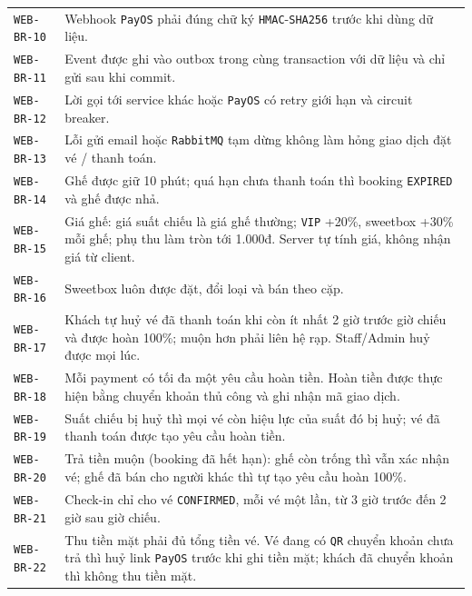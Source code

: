 \begin{longtable}{@{}P{0.23000\SRSWidth}P{0.77000\SRSWidth}@{}}
\texttt{WEB-\allowbreak{}BR-\allowbreak{}10} & Webhook \texttt{Pay\allowbreak{}OS} phải đúng chữ ký \texttt{HMAC}-\texttt{SHA256} trước khi dùng dữ liệu. \\[3pt]
\texttt{WEB-\allowbreak{}BR-\allowbreak{}11} & Event được ghi vào outbox trong cùng transaction với dữ liệu và chỉ gửi sau khi commit. \\[3pt]
\texttt{WEB-\allowbreak{}BR-\allowbreak{}12} & Lời gọi tới service khác hoặc \texttt{Pay\allowbreak{}OS} có retry giới hạn và circuit breaker. \\[3pt]
\texttt{WEB-\allowbreak{}BR-\allowbreak{}13} & Lỗi gửi email hoặc \texttt{Rabbit\allowbreak{}MQ} tạm dừng không làm hỏng giao dịch đặt vé /\allowbreak{} thanh toán. \\[3pt]
\texttt{WEB-\allowbreak{}BR-\allowbreak{}14} & Ghế được giữ 10 phút; quá hạn chưa thanh toán thì booking \texttt{EXPIRED} và ghế được nhả. \\[3pt]
\texttt{WEB-\allowbreak{}BR-\allowbreak{}15} & Giá ghế: giá suất chiếu là giá ghế thường; \texttt{VIP} +20\%, sweetbox +30\% mỗi ghế; phụ thu làm tròn tới 1.000đ. Server tự tính giá, không nhận giá từ client. \\[3pt]
\texttt{WEB-\allowbreak{}BR-\allowbreak{}16} & Sweetbox luôn được đặt, đổi loại và bán theo cặp. \\[3pt]
\texttt{WEB-\allowbreak{}BR-\allowbreak{}17} & Khách tự huỷ vé đã thanh toán khi còn ít nhất 2 giờ trước giờ chiếu và được hoàn 100\%; muộn hơn phải liên hệ rạp. Staff/\allowbreak{}Admin huỷ được mọi lúc. \\[3pt]
\texttt{WEB-\allowbreak{}BR-\allowbreak{}18} & Mỗi payment có tối đa một yêu cầu hoàn tiền. Hoàn tiền được thực hiện bằng chuyển khoản thủ công và ghi nhận mã giao dịch. \\[3pt]
\texttt{WEB-\allowbreak{}BR-\allowbreak{}19} & Suất chiếu bị huỷ thì mọi vé còn hiệu lực của suất đó bị huỷ; vé đã thanh toán được tạo yêu cầu hoàn tiền. \\[3pt]
\texttt{WEB-\allowbreak{}BR-\allowbreak{}20} & Trả tiền muộn (booking đã hết hạn): ghế còn trống thì vẫn xác nhận vé; ghế đã bán cho người khác thì tự tạo yêu cầu hoàn 100\%. \\[3pt]
\texttt{WEB-\allowbreak{}BR-\allowbreak{}21} & Check-in chỉ cho vé \texttt{CONFIRME\allowbreak{}D}, mỗi vé một lần, từ 3 giờ trước đến 2 giờ sau giờ chiếu. \\[3pt]
\texttt{WEB-\allowbreak{}BR-\allowbreak{}22} & Thu tiền mặt phải đủ tổng tiền vé. Vé đang có \texttt{QR} chuyển khoản chưa trả thì huỷ link \texttt{Pay\allowbreak{}OS} trước khi ghi tiền mặt; khách đã chuyển khoản thì không thu tiền mặt. \\[3pt]

\end{longtable}
